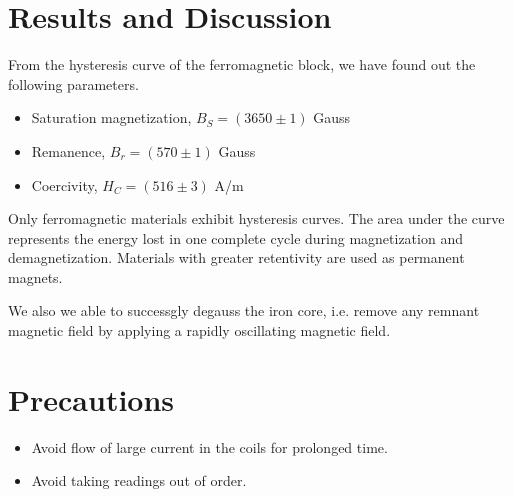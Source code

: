 \section{Results and Discussion}
From the hysteresis curve of the ferromagnetic block, we have found out the following parameters.

\begin{itemize}
    \item Saturation magnetization, $B_S= (3650 \pm 1)$ Gauss
    \item Remanence, $B_r= (570 \pm 1)$ Gauss
    \item Coercivity, $H_C= (516 \pm 3)$ A/m\\
\end{itemize} 

Only ferromagnetic materials exhibit hysteresis
curves. The area under the curve represents the energy lost in one complete cycle during magnetization and demagnetization. Materials with greater retentivity are used as
permanent magnets.

We also we able to successgly degauss the iron core, i.e. remove any remnant magnetic field by applying a rapidly oscillating magnetic field.

\section{Precautions}
\begin{itemize}
    \item Avoid flow of large current in the coils for prolonged time.
    \item Avoid taking readings out of order.
\end{itemize} 